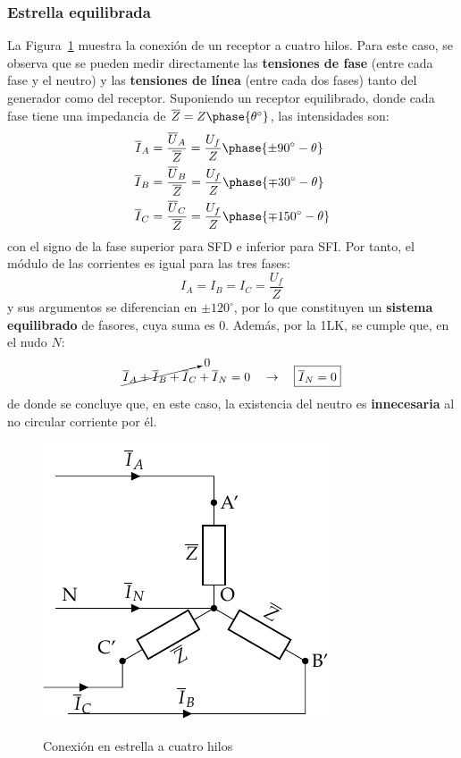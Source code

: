 	\subsubsection{Estrella equilibrada}
	La Figura~\ref{fig:conexion_estrella_4} muestra la conexión de un receptor a cuatro hilos. Para este caso, se observa que se pueden medir directamente las \textbf{tensiones de fase} (entre cada fase y el neutro) y las \textbf{tensiones de línea} (entre cada dos fases) tanto del generador como del receptor. Suponiendo un receptor equilibrado, donde cada fase tiene una impedancia de $\overline{Z}=Z\phase{\theta^\circ}$, las intensidades son:
	\begin{align*}
      \overline{I}_A &= \dfrac{\overline{U}_A}{\overline{Z}} = \dfrac{U_f}{Z}\phase{\pm 90^\circ - \theta} \\
      \overline{I}_B &= \frac{\overline{U}_B}{\overline{Z}} = \frac{U_f}{Z}\phase{{\mp 30^\circ} - \theta}\\
      \overline{I}_C &= \frac{\overline{U}_C}{\overline{Z}} = \frac{U_f}{Z}\phase{{\mp 150^\circ} - \theta}
    \end{align*}
    con el signo de la fase superior para SFD e inferior para SFI. Por tanto, el módulo de las corrientes es igual para las tres fases: 
    \begin{equation}
        \boxed{I_A = I_B = I_C = \dfrac{U_f}{Z}}
    \end{equation}
    y sus argumentos se diferencian en $\pm120^\circ$, por lo que constituyen un \textbf{sistema equilibrado} de fasores, cuya suma es 0. Además, por la 1LK, se cumple que, en el nudo $N$: 
    \begin{equation}
        \cancelto{0}{\overline{I}_A  + \overline{I}_B + \overline{I}_C} + \overline{I}_N = 0 \quad\rightarrow\quad \boxed{\overline{I}_N = 0}
    \end{equation}
    de donde se concluye que, en este caso, la existencia del neutro es \textbf{innecesaria} al no circular corriente por él. 
	\begin{figure}[H]
		\centering
		{\includegraphics{../figs/EstrellaEquilibrado_Receptor.pdf}}
		\caption{Conexión en estrella a cuatro hilos}
		\label{fig:conexion_estrella_4}
	\end{figure}
	

